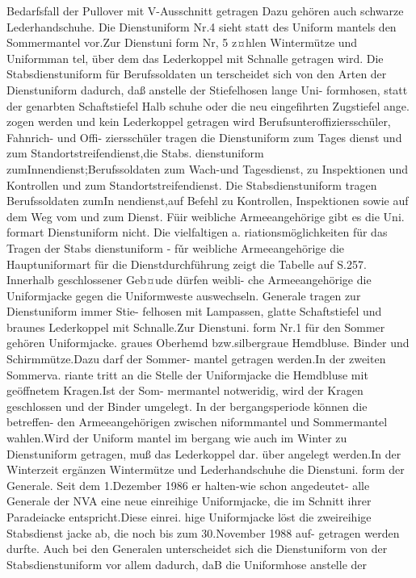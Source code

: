 Bedarfsfall der Pullover mit V-Ausschnitt getragen
Dazu gehören auch schwarze Lederhandschuhe.
Die Dienstuniform Nr.4 sieht statt des Uniform
mantels den Sommermantel vor.Zur Dienstuni
form Nr, 5 z¤hlen Wintermütze und Uniformman
tel, über dem das Lederkoppel mit Schnalle
getragen wird.
Die Stabsdienstuniform für Berufssoldaten un
terscheidet sich von den Arten der Dienstuniform
dadurch, daß anstelle der Stiefelhosen lange Uni-
formhosen, statt der genarbten Schaftstiefel Halb
schuhe oder die neu eingefihrten Zugstiefel ange.
zogen werden und kein Lederkoppel getragen wird
Berufsunteroffiziersschüler, Fahnrich- und Offi-
ziersschüler tragen die Dienstuniform zum Tages dienst und zum Standortstreifendienst,die Stabs.
dienstuniform zumInnendienst;Berufssoldaten
zum Wach-und Tagesdienst, zu Inspektionen und
Kontrollen und zum Standortstreifendienst. Die
Stabsdienstuniform tragen Berufssoldaten zumIn
nendienst,auf Befehl zu Kontrollen, Inspektionen
sowie auf dem Weg vom und zum Dienst.
Füir weibliche Armeeangehörige gibt es die Uni.
formart Dienstuniform nicht. Die vielfaltigen a.
riationsmöglichkeiten für das Tragen der Stabs
dienstuniform - fǔr weibliche Armeeangehörige
die Hauptuniformart für die Dienstdurchführung
zeigt die Tabelle auf S.257.
Innerhalb geschlossener Geb¤ude dürfen weibli-
che Armeeangehörige die Uniformjacke gegen die
Uniformweste auswechseln.
Generale tragen zur Dienstuniform immer Stie-
felhosen mit Lampassen, glatte Schaftstiefel und
braunes Lederkoppel mit Schnalle.Zur Dienstuni.
form Nr.1 für den Sommer gehören Uniformjacke.
graues Oberhemd bzw.silbergraue Hemdbluse.
Binder und Schirmmütze.Dazu darf der Sommer-
mantel getragen werden.In der zweiten Sommerva.
riante tritt an die Stelle der Uniformjacke die
Hemdbluse mit geöffnetem Kragen.Ist der Som-
mermantel notweridig, wird der Kragen geschlossen
und der Binder umgelegt.
In der bergangsperiode können die betreffen-
den Armeeangehörigen zwischen niformmantel
und Sommermantel wahlen.Wird der Uniform
mantel im bergang wie auch im Winter zu
Dienstuniform getragen, muß das Lederkoppel dar.
über angelegt werden.In der Winterzeit ergänzen
Wintermütze und Lederhandschuhe die Dienstuni.
form der Generale. Seit dem 1.Dezember 1986 er
halten-wie schon angedeutet- alle Generale der
NVA eine neue einreihige Uniformjacke, die im
Schnitt ihrer Paradeiacke entspricht.Diese einrei.
hige Uniformjacke löst die zweireihige Stabsdienst
jacke ab, die noch bis zum 30.November 1988 auf-
getragen werden durfte.
Auch bei den Generalen unterscheidet sich die
Dienstuniform von der Stabsdienstuniform vor allem dadurch, daB die Uniformhose anstelle der
